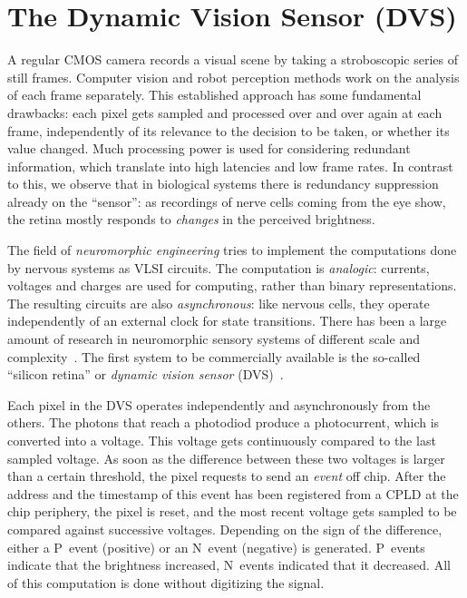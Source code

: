 
\section{The Dynamic Vision Sensor (DVS)\label{sec:The-DVS-camera}}

A regular CMOS camera records a visual scene by taking a stroboscopic
series of still frames. Computer vision and robot perception methods
work on the analysis of each frame separately. This established approach
has some fundamental drawbacks: each pixel gets sampled and processed
over and over again at each frame, independently of its relevance
to the decision to be taken, or whether its value changed. Much processing
power is used for considering redundant information, which translate
into high latencies and low frame rates. In contrast to this, we observe
that in biological systems there is redundancy suppression already
on the \textquotedblleft{}sensor\textquotedblright{}: as recordings
of nerve cells coming from the eye show, the retina mostly responds
to \emph{changes} in the perceived brightness.

The field of\emph{ neuromorphic engineering} tries to implement the
computations done by nervous systems as VLSI circuits. The computation
is \emph{analogic}: currents, voltages and charges are used for computing,
rather than binary representations. The resulting circuits are also
\emph{asynchronous}: like nervous cells, they operate independently
of an external clock for state transitions. There has been a large
amount of research in neuromorphic sensory systems of different scale
and complexity~\cite{liu10neuromorphic}. The first system to be
commercially available is the so-called ``silicon retina'' or \emph{dynamic
vision sensor} (DVS)~\cite{lichtsteiner08asynchronous}.

Each pixel in the DVS operates independently and asynchronously from
the others. The photons that reach a photodiod produce a photocurrent,
which is converted into a voltage. This voltage gets continuously
compared to the last sampled voltage. As soon as the difference between
these two voltages is larger than a certain threshold, the pixel requests
to send an \emph{event} off chip. After the address and the timestamp
of this event has been registered from a CPLD at the chip periphery,
the pixel is reset, and the most recent voltage gets sampled to be
compared against successive voltages. Depending on the sign of the
difference, either a P~event (positive) or an N~event (negative)
is generated. P~events indicate that the brightness increased, N~events
indicated that it decreased. All of this computation is done without
digitizing the signal. 

